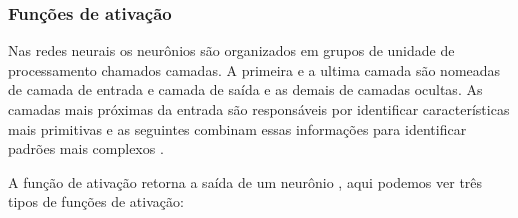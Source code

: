 \subsubsection{Funções de ativação}

Nas redes neurais os neurônios são organizados em grupos de unidade de processamento chamados camadas. A primeira e a ultima camada são nomeadas de camada de entrada e camada de saída e as demais de camadas ocultas. As camadas mais próximas da entrada são responsáveis por identificar características mais primitivas e as seguintes combinam essas informações para identificar padrões mais complexos \cite{marti2017aprendizado}.

A função de ativação retorna a saída de um neurônio \cite{haykin1999neural}, aqui podemos ver três tipos de funções de ativação:

